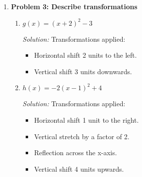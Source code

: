 \documentclass[a4paper,12pt]{book}
\newenvironment{solution}[1][]
{\par\noindent\textit{Solution:} \rmfamily}{\medskip}
\begin{document}
\begin{enumerate}
\begin{enumerate}[label=(\alph*)]
        \item \( g(x) = x^4 + 4 \)
        \begin{solution}
        Testing for even symmetry: \( g(-x) = (-x)^4 + 4 = x^4 + 4 = g(x) \).\\
        Therefore, \( g(x) \) is an even function.
        \end{solution}

        \item \( h(x) = x^3 + 3x \)
        \begin{solution}
        Testing for odd symmetry: \( h(-x) = (-x)^3 + 3(-x) = -x^3 - 3x = -h(x) \).\\
        Therefore, \( h(x) \) is an odd function.
        \end{solution}
    \end{enumerate}

    \item \textbf{Problem 3: Describe transformations}
    \begin{enumerate}[label=(\alph*)]
        \item \( g(x) = (x + 2)^2 - 3 \)
        \begin{solution}
        Transformations applied:
        \begin{itemize}
            \item Horizontal shift 2 units to the left.
            \item Vertical shift 3 units downwards.
        \end{itemize}
        \end{solution}

        \item \( h(x) = -2(x - 1)^2 + 4 \)
        \begin{solution}
        Transformations applied:
        \begin{itemize}
            \item Horizontal shift 1 unit to the right.
            \item Vertical stretch by a factor of 2.
            \item Reflection across the x-axis.
            \item Vertical shift 4 units upwards.
        \end{itemize}
        \end{solution}
    \end{enumerate}


\end{enumerate}
\end{document}
